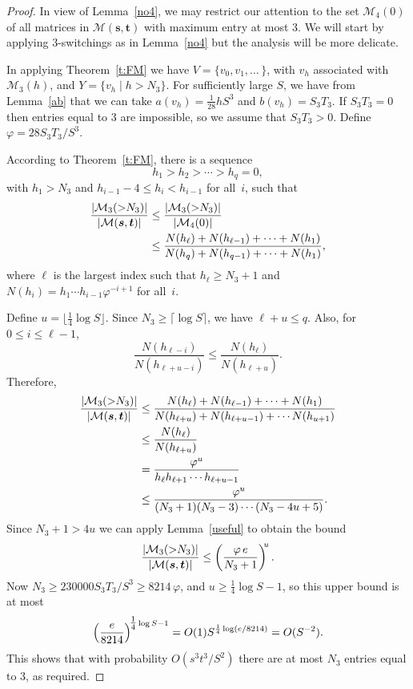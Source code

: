 \documentclass[12pt]{article}
\numberwithin{equation}{section}
\def\M{{\mathcal{M}}}
\def\svec{{\boldsymbol{s}}}
\def\tvec{{\boldsymbol{t}}}
\def\Mst{{\M(\svec,\tvec)}}
\begin{document}
\begin{proof}
In view of Lemma~\ref{no4},
we may restrict our attention to the set $\M_4(0)$ of all matrices
in $\Mst$ with maximum entry at most 3.
We will start by applying 3-switchings as in 
Lemma~\ref{no4}
but the analysis will be more delicate.

In applying Theorem~\ref{t:FM} we have $V=\{ v_0,v_1,\ldots\,\}$,
with $v_h$ associated with $\M_3(h)$, and $Y=\{v_h \mid h > N_3\}$.
For sufficiently large $S$, we have from Lemma~\ref{ab} that
we can take $a(v_h)=\tfrac1{28}hS^3$ and $b(v_h)=S_3T_3$. 
If $S_3T_3=0$ then entries equal to 3 are impossible, so
we assume that $S_3T_3>0$.
Define $\varphi = 28 S_3T_3/S^3$.

According to Theorem~\ref{t:FM}, there is a sequence
\[ h_1 > h_2 > \cdots > h_q = 0,\]
with $h_1 > N_3$ and 
$h_{i-1} -4 \le h_{i} < h_{i-1}$ for all~$i$,
such that
\begin{align*}
 \frac{\card{\M_3({>}N_3)}}{\card{\Mst}}
    &\leq
          \frac{\card{\M_3({>}N_3)}}{\card{\M_4(0)}}\\
    &\leq \frac{N(h_\ell)  + N(h_{\ell-1}) + \cdots + N(h_1)}
             {N(h_{q}) + N(h_{q-1}) + \cdots + N(h_1)},
\end{align*}
where $\ell$ is the largest index such that $h_\ell\ge N_3+1$ and 
$N(h_i) = h_1\cdots h_{i-1} \varphi^{-i+1}$ for all~$i$.

Define $u=\lfloor\tfrac14\log S\rfloor$.
Since $N_3\ge\lceil\log S\rceil$, we have $\ell+u\le q$.
Also, for $0\le i\le\ell-1$,
\[ \frac{N(h_{\ell-i})}{N(h_{\ell+u-i})}
  \leq \frac{N(h_\ell)}{N(h_{\ell+u})}. \]
Therefore,
\begin{align*}
 \frac{\card{\M_3({>}N_3)}}{\card{\Mst}}
    &\leq \frac{N(h_\ell)  + N(h_{\ell-1}) + \cdots + N(h_1)}
             {N(h_{\ell+u}) + N(h_{\ell+u-1}) + \cdots N(h_{u+1})} \\
    &\leq \frac{N(h_\ell)}{N(h_{\ell+u})} \\
    &= \frac{\varphi^u}{h_\ell h_{\ell+1}\cdots h_{\ell+u-1}} \\
    &\leq \frac{\varphi^u}{(N_3+1)(N_3-3)\cdots(N_3-4u+5)}. 
\end{align*}
Since $N_3+1 > 4u$ we can apply Lemma~\ref{useful} 
to obtain the bound
\[
 \frac{\card{\M_3({>}N_3)}}{\card{\Mst}} 
  \leq \left(\frac{\varphi \, e}{N_3 + 1}\right)^{\!\!u}.
\]
Now $N_3\geq 230000 S_3T_3/S^3\geq 8214\, \varphi$,
and $u\ge\tfrac14\log S-1$,
so this upper bound is at most
\[
 \Bigl(\frac{e}{8214}\Bigr)^{\!\tfrac14\log S-1} 
  = O(1)S^{\frac14\log(e/8214)}\\
   = O(S^{-2}).
\]
This shows that with probability
$O(s^3t^3/S^2)$ there are at most $N_3$ entries equal to 3, as required.


\end{proof}
\end{document}
